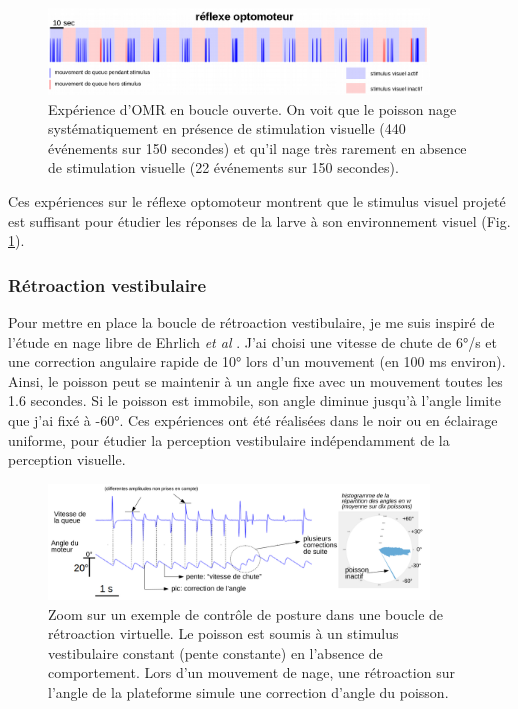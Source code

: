 
\begin{figure}
\centering
\includegraphics[width=0.9\textwidth]{./files/omr.png}
\caption{Expérience d'OMR en boucle ouverte. On voit que le poisson nage systématiquement en présence de stimulation visuelle (440 événements sur 150 secondes) et qu'il nage très rarement en absence de stimulation visuelle (22 événements sur 150 secondes).}
\label{FigOMRopenloop}
\end{figure}

Ces expériences sur le réflexe optomoteur montrent que le stimulus visuel projeté est suffisant pour étudier les réponses de la larve à son environnement visuel (Fig. \ref{FigOMRopenloop}).

\subsubsection{Rétroaction vestibulaire}
Pour mettre en place la boucle de rétroaction vestibulaire, je me suis inspiré de l'étude en nage libre de Ehrlich \emph{et al} \cite{ehrlich_control_2017}. J'ai choisi une vitesse de chute de 6°/s et une correction angulaire rapide de 10° lors d'un mouvement (en 100 ms environ). Ainsi, le poisson peut se maintenir à un angle fixe avec un mouvement toutes les 1.6 secondes. Si le poisson est immobile, son angle diminue jusqu'à l'angle limite que j'ai fixé à -60°. Ces expériences ont été réalisées dans le noir ou en éclairage uniforme, pour étudier la perception vestibulaire indépendamment de la perception visuelle.

\begin{figure}
\centering
\includegraphics[width=0.9\textwidth]{./files/vestibular_feedback.svg.png}
\caption{Zoom sur un exemple de contrôle de posture dans une boucle de rétroaction virtuelle. Le poisson est soumis à un stimulus vestibulaire constant (pente constante) en l'absence de comportement. Lors d'un mouvement de nage, une rétroaction sur l'angle de la plateforme simule une correction d'angle du poisson.}
\end{figure}

